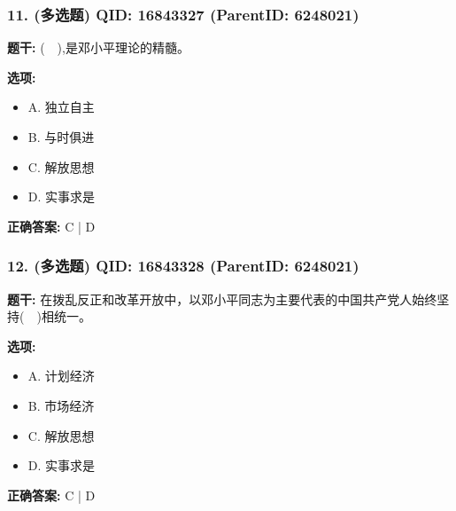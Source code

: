 \documentclass[12pt,UTF8]{ctexart}
\begin{document}
\vspace{0.3em}\hrulefill\vspace{0.7em}

\subsubsection*{11. (多选题) \small QID: 16843327 (ParentID: 6248021)}

\textbf{题干:}
(  ),是邓小平理论的精髓。



\textbf{选项:}
\begin{itemize}[leftmargin=*]

  \item A. 独立自主

  \item B. 与时俱进

  \item C. 解放思想

  \item D. 实事求是

\end{itemize}

\textbf{正确答案:}
C | D

\vspace{0.3em}\hrulefill\vspace{0.7em}

\subsubsection*{12. (多选题) \small QID: 16843328 (ParentID: 6248021)}

\textbf{题干:}
在拨乱反正和改革开放中，以邓小平同志为主要代表的中国共产党人始终坚持(  )相统一。



\textbf{选项:}
\begin{itemize}[leftmargin=*]

  \item A. 计划经济

  \item B. 市场经济

  \item C. 解放思想

  \item D. 实事求是

\end{itemize}

\textbf{正确答案:}
C | D

\vspace{0.3em}\hrulefill\vspace{0.7em}
\end{document}
